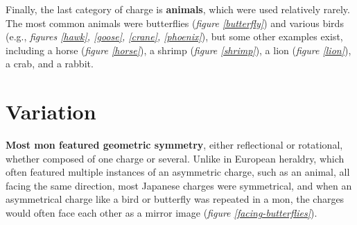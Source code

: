 \documentclass{article}
\begin{document}
  Finally, the last category of charge is \textbf{animals}, which were used
  relatively rarely.  The most common animals were butterflies
  (\emph{figure \ref{butterfly}}) and various birds (e.g., \emph{figures
  \ref{hawk}, \ref{goose}, \ref{crane}, \ref{phoenix}}), but some other examples
  exist, including a horse (\emph{figure \ref{horse}}), a shrimp
  (\emph{figure \ref{shrimp}}), a lion (\emph{figure \ref{lion}}), a crab,
  and a rabbit.

  \begin{figure}
  \begin{subfigs}
  \end{subfigs}
  \end{figure}

  \begin{figure}
  \begin{subfigs}
  \end{subfigs}
  \begin{subfigs}
  \end{subfigs}
  \end{figure}

\section{Variation}

  \textbf{Most mon featured geometric symmetry}, either reflectional or
  rotational, whether composed of one charge or several.  Unlike in
  European heraldry, which often featured multiple instances of an asymmetric
  charge, such as an animal, all facing the same direction, most Japanese
  charges were symmetrical, and when an asymmetrical charge like
  a bird or butterfly was repeated in a mon, the charges would often face each other as
  a mirror image (\emph{figure \ref{facing-butterflies}}).
\end{document}
